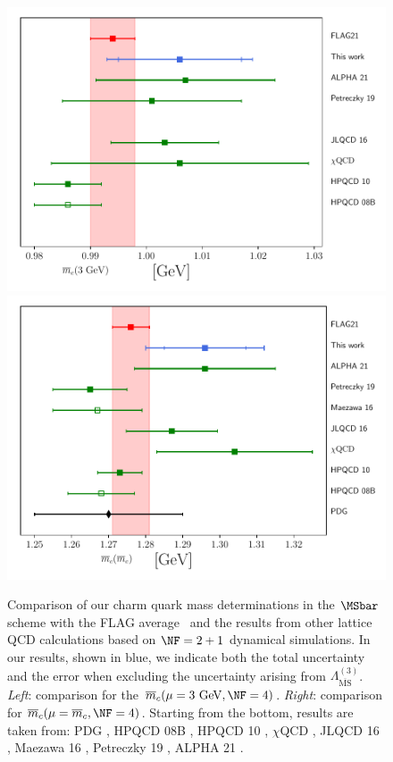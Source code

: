 \begin{figure}[t!]
	\centering
	\hspace{-0mm}
	\includegraphics[scale=0.47]{./cap6/figs/mc/mc_comparison_3gev.pdf}
	\includegraphics[scale=0.47]{./cap6/figs/mc/mc_comparison.pdf}
	\caption{Comparison of our charm quark mass determinations in the $\MSbar$ scheme with the FLAG average~\cite{FlavourLatticeAveragingGroupFLAG:2021npn} and the results from other lattice QCD calculations based on $\NF=2+1$ dynamical simulations. In our results, shown in blue, we indicate both the total uncertainty and the error when excluding the uncertainty arising from $\Lambda^{(3)}_{\overline{\mathrm{MS}}}$. \textit{Left}: comparison for the  $\overline{m}_c(\mu=3\ \mathrm{GeV}, \NF=4)$. \textit{Right}: comparison for $\overline{m}_c(\mu=\overline{m}_c, \NF=4)$.  Starting from the bottom, results are taken from: PDG \cite{ParticleDataGroup:2022pth}, HPQCD 08B \cite{HPQCD:2008kxl}, HPQCD 10 \cite{McNeile:2010ji}, $\chi$QCD \cite{Yang:2014sea}, JLQCD 16 \cite{Nakayama:2016atf}, Maezawa 16 \cite{Maezawa:2016vgv}, Petreczky 19 \cite{Petreczky:2019ozv}, ALPHA 21 \cite{Heitger:2021apz}.
       }
	\label{fig:mc_comparison}
\end{figure}

